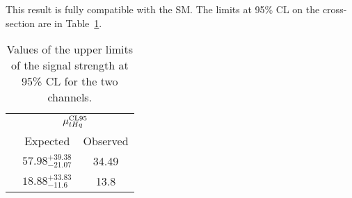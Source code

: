 This result is fully compatible with the SM. 
The limits at 95\% CL on the \tHq cross-section are in Table~\ref{tab:Conclusion:UpperLimit}.

\begin{table}[h]
\centering
\begin{tabular}{l|c|c}
\cline{2-3}
            		& \multicolumn{2}{c}{$\mu_{tHq}^{\text{CL95}}$} \\ \cline{2-3}
            		& Expected       				& Observed       \\ \midrule
\dilepOStau 	& $57.98^{+39.38}_{-21.07}$		&    34.49            \\
\dilepSStau 	& $18.88^{+33.83}_{-11.6}$		&    13.8            \\ \bottomrule
\end{tabular}
\caption{Values of the upper limits of the signal strength at 95\% CL for the two \dileptau channels.}
\label{tab:Conclusion:UpperLimit}
\end{table}


